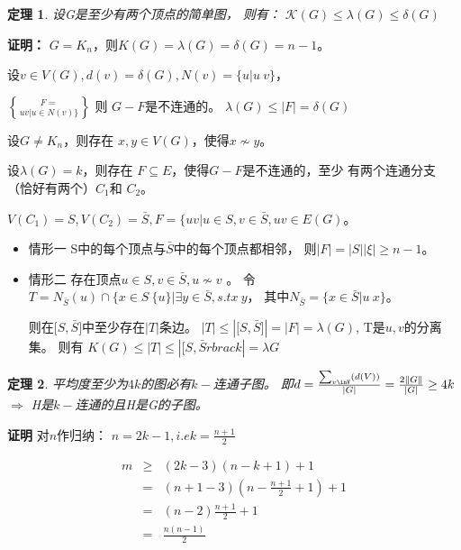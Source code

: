 \documentclass[UTF8]{ctexart}
\newtheorem{thm}{定理}
\begin{document}
    \begin{thm}
    设G是至少有两个顶点的简单图，
    则有：
    $ \mathcal{K}(G)  \leq \lambda(G)  \leq \delta(G)$
    \end{thm}
    
    \textbf{证明：}
    $ G=K_{n} $，则$ \mathit{K}(G)=\lambda(G)=\delta(G)=n-1$。
    
    设$ v \in V(G), d(v)=\delta(G), N(v) = \lbrace u| u~v \rbrace $，
    
    $ F = \brace uv|u \in N(v) \rbrace $ 则 $G-F$是不连通的。
    $\lambda(G) \leq |F|= \delta(G) $
    
    设$ G \neq K_{n}$，则存在 $ x,y \in V(G) $，使得$x \not\sim y$。
    
    设$ \lambda(G)=k $，则存在 $ F \subseteq E $，使得$G-F$是不连通的，至少
    有两个连通分支（恰好有两个）$ C_{1}$和 $ C_{2}$。
    
    $V(C_{1})=S, V(C_{2})=\bar{S}, F= \lbrace uv| u \in S, v \in \bar{S}, uv \in E(G)$。
    
    \begin{itemize}
    \item 情形一 S中的每个顶点与$ \bar{S} $中的每个顶点都相邻，
    则$|F| = |S||\xi| \geq n-1$。
    \item 情形二 存在顶点$u\in S,v \in \bar{S}, u\not\sim v$  。
    令$T=N_{\bar{S}}(u) \cap \lbrace x\in S \ \lbrace u \rbrace | \exists y \in \bar{S}, s.t x~y$，
    其中$N_{\bar{S}}= \lbrace x \in \bar{S} | u~x \rbrace$。
    
    则在$\lbrack S,\bar{S} \rbrack $中至少存在$|T|$条边。
    $|T| \leq | \lbrack S, \bar{S} \rbrack | = |F| = \lambda(G) $,
    T是$u,v$的分离集。
    则有 $\mathit{K}(G) \leq |T| \leq | \lbrack S, \bar{S} rbrack | = \lambda{G}  $
    
    \end{itemize}
    
    \begin{thm}
    平均度至少为$4k$的图必有$k-$连通子图。
    即$d = \frac{ \sum_{ v\inV }( d(V) ) }{|G|} = \frac{2\| G \|}{|G|} \geq 4k$
    $\Longrightarrow$
    H是$k-$连通的且H是G的子图。
    \end{thm}
    
    \textbf{证明}
    对$n$作归纳：
    $n=2k-1 ,i.e k = \frac{n+1}{2} $ 
    
    \begin{eqnarray*}
    m &\geq & (2k-3)(n-k+1)+1\\
      & =   & ( n+1-3 )( n - \frac{n+1}{2} +1 )+1 \\
      & =   & ( n - 2 ) \frac{n+1}{2} + 1 \\
      & =   & \frac{n(n-1)}{2}
    \end{eqnarray*}
    
\end{document}
